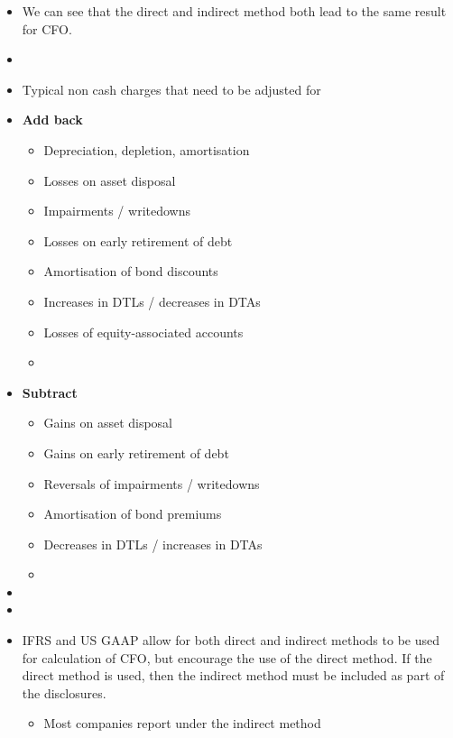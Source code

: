 \documentclass[../notes_compiled.tex]{subfiles}
\begin{document}
\begin{itemize}
\item We can see that the direct and indirect method both lead to the same result for CFO.
\item[]
\item Typical non cash charges that need to be adjusted for
\item[] \textbf{Add back}
\begin{multicols}{2}
\begin{itemize}
\item Depreciation, depletion, amortisation
\item Losses on asset disposal
\item Impairments / writedowns
\item Losses on early retirement of debt
\item Amortisation of bond discounts
\item Increases in DTLs / decreases in DTAs
\item Losses of equity-associated accounts
\item[]
\end{itemize}
\end{multicols}
\item[] \textbf{Subtract}
\begin{multicols}{2}
\begin{itemize}
\item Gains on asset disposal
\item Gains on early retirement of debt
\item Reversals of impairments / writedowns
\item Amortisation of bond premiums
\item Decreases in DTLs / increases in DTAs
\item[]
\end{itemize}
\end{multicols}
\item[]
\item[]
\item IFRS and US GAAP allow for both direct and indirect methods to be used for calculation of CFO, but encourage the use of the direct method. If the direct method is used, then the indirect method must be included as part of the disclosures.
\begin{itemize}
\item Most companies report under the indirect method
\end{itemize}
\end{itemize}
\end{document}
